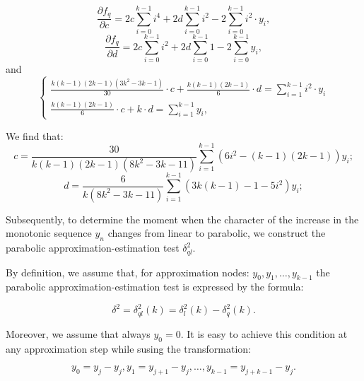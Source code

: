 \begin{equation}
	\label{eqn:40}
	\frac{\partial f_q}{\partial c} = 2c \sum_{i=0}^{k-1} i^4 + 2d \sum_{i=0}^{k-1}i^2 - 2\sum_{i=0}^{k-1}i^2 \cdot y_i,
\end{equation}
\begin{equation}
	\label{eqn:41}
	\frac{\partial f_q}{\partial d} = 2c \sum_{i=0}^{k-1} i^2 + 2d \sum_{i=0}^{k-1}1 - 2\sum_{i=0}^{k-1} y_i,
\end{equation} and
\begin{equation}
	\label{eqn:42}
		\begin{cases}
		\frac{k(k-1)(2k-1)(3k^2 - 3k - 1)}{30} \cdot c + \frac{k(k-1)(2k-1)}{6} \cdot d = \sum_{i=1}^{k-1} i^2 \cdot y_i \\
		\frac{k(k-1)(2k-1)}{6} \cdot c + k \cdot d = \sum_{i=1}^{k-1} y_i,
	\end{cases}
\end{equation}

We find that:
\begin{equation}
	\label{eqn:43}
	c = \frac{30}{k(k-1)(2k - 1)(8k^2 - 3k -11)}{\sum_{i=1}^{k-1}(6i^2 - (k-1)(2k -1))y_i};
\end{equation}
\begin{equation}
	\label{eqn:44}
	d = \frac{6}{k(8k^2 - 3k -11)}{\sum_{i=1}^{k-1}(3k(k-1) - 1 - 5i^2)y_i};
\end{equation}

Subsequently, to determine the moment when the character of the increase in the monotonic
sequence \(y_n\) changes from linear to parabolic, we construct the parabolic approximation-estimation
test \(\delta_{ql}^2\).

By definition, we assume that, for approximation nodes:  \(y_0, y_1, \ldots , y_{k-1}\) the parabolic
approximation-estimation test \cite{Orekhov201809,Orekhov2018} is expressed by the formula:

\begin{equation}
	\label{eqn:45}
	\delta^2 = \delta_{ql}^2(k) = \delta_l^2(k) - \delta_q^2(k).
\end{equation}

Moreover, we assume that always \(y_0 = 0\). It is easy to achieve this condition at any approximation step while susing the transformation:

\begin{equation}
	\label{eqn:46}
	y_0 = y_j - y_j, y_1 = y_{j+1} - y_j, \ldots, y_{k-1} = y_{j+k-1} - y_j.
\end{equation}

